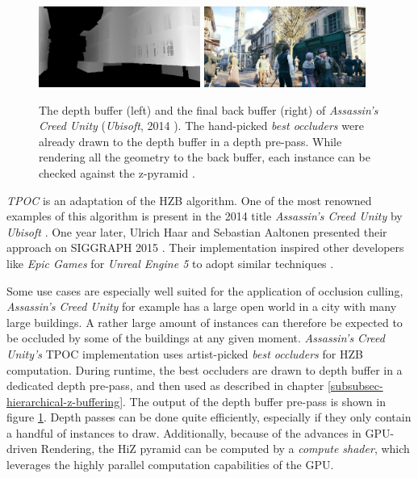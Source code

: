 \begin{figure}[h]
    \centering
    \includegraphics[width=200px]{images/graphics/depth-buffer-ac-unity.jpg}
    \includegraphics[width=200px]{images/graphics/final-frame-ac-unity.jpg}
    \caption{The depth buffer (left) and the final back buffer (right) of \emph{Assassin's Creed Unity} (\emph{Ubisoft}, 2014 \cite{Ubisoft2014}). 
    The hand-picked \emph{best occluders} were already drawn to the depth buffer in a depth pre-pass.
    While rendering all the geometry to the back buffer, each instance can be checked against the z-pyramid \cite{Kruskonja2022}.}
    \label{fig:depth-buffer-ac-unity}
\end{figure}

\noindent
\emph{\ac{TPOC}} is an adaptation of the \ac{HZB} algorithm. One of the most renowned examples of this algorithm is 
present in the 2014 title \emph{Assassin's Creed Unity} by \emph{Ubisoft} \cite{Ubisoft2014}. One year later, Ulrich 
Haar and Sebastian Aaltonen presented their approach on SIGGRAPH 2015 \cite{Aaltonen2015}. Their implementation 
inspired other developers like \emph{Epic Games} for \emph{Unreal Engine 5} to adopt similar techniques \cite{Karis2021}.

\noindent
Some use cases are especially well suited for the application of occlusion culling, \emph{Assassin's Creed Unity} for 
example has a large open world in a city with many large buildings. A rather large amount of instances can therefore be 
expected to be occluded by some of the buildings at any given moment. \emph{Assassin's Creed Unity's} \ac{TPOC} 
implementation uses artist-picked \emph{best occluders} for \ac{HZB} computation. During runtime, the best occluders are 
drawn to depth buffer in a dedicated depth pre-pass, and then used as described in chapter \ref{subsubsec-hierarchical-z-buffering}. 
The output of the depth buffer pre-pass is shown in figure \ref{fig:depth-buffer-ac-unity}. Depth passes can be done 
quite efficiently, especially if they only contain a handful of instances to draw. Additionally, because of the advances 
in \ac{GPU}-driven Rendering, the \ac{HiZ} pyramid can be computed by a \emph{compute shader}, which leverages the 
highly parallel computation capabilities of the \ac{GPU}. \\

